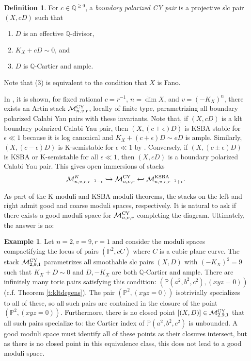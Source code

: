 \documentclass[11pt]{amsart}
\numberwithin{equation}{section}
\theoremstyle{definition}
\newtheorem{defn}[theorem]{Definition}
\newtheorem{example}[theorem]{Example}
\newcommand{\bQ}{\mathbb{Q}}
\newcommand{\KSBA}{{\rm KSBA}}
\newcommand{\bP}{\mathbb{P}}
\newcommand{\cM}{\mathcal M}
\begin{document}
\begin{defn}\label{d:bpcy}
For $c \in \bQ^{\ge 0}$, a \emph{boundary polarized CY pair} is a projective slc pair $(X,cD)$ such that 
\begin{enumerate}
	\item $D$ is an effective $\bQ$-divisor,
	\item $K_{X}+cD\sim 0$, and
	\item $D$ is $\mathbb{Q}$-Cartier and ample.
\end{enumerate}
Note that (3) is equivalent to the condition that $X$ is Fano. 
\end{defn}

In \cite{BABWILD}, it is shown, for fixed rational $c = r^{-1}$, $n = \dim X$, and $v = (-K_X)^n$, there exists an Artin stack $\cM^{\rm CY}_{n,v,r}$, locally of finite type, parametrizing all boundary polarized Calabi Yau pairs with these invariants.  Note that, if $(X,cD)$ is a klt boundary polarized Calabi Yau pair, then $(X,(c+\epsilon)D)$ is KSBA stable for $\epsilon \ll 1$ because it is log canonical and $K_X + (c+\epsilon )D \sim e D$ is ample.  Similarly, $(X,(c-\epsilon)D)$ is K-semistable for $\epsilon \ll 1$ by \cite[Lemma 5.3]{Zhou}.  Conversely, if $(X, (c\pm\epsilon)D)$ is KSBA or K-semistable for all $\epsilon \ll 1$, then $(X,cD)$ is a boundary polarized Calabi Yau pair.  This gives open immersions of stacks 
\[ \cM^K_{n,v,r,r^{-1}-\epsilon} \hookrightarrow \cM^{\rm CY}_{n,v,r} \hookleftarrow \cM^\KSBA_{n,v,r,r^{-1}+\epsilon}.\]

As part of the K-moduli and KSBA moduli theorems, the stacks on the left and right admit good and coarse moduli spaces, respectively.  It is natural to ask if there exists a good moduli space for $\cM^{\rm CY}_{n,v,r}$ completing the diagram.  Ultimately, the answer is no: 

\begin{example}
    Let $n = 2, v = 9, r = 1$ and consider the moduli spaces compactifying the locus of pairs $(\bP^2, cC)$ where $C$ is a cubic plane curve.  The stack $\cM^{\rm CY}_{2,9,1}$ parametrizes all smoothable slc pairs $(X,D)$ with $(-K_X)^2 = 9$ such that $K_X + D \sim 0$ and $D, -K_X$ are both $\bQ$-Cartier and ample.  There are infinitely many toric pairs satisfying this condition: $(\bP(a^2, b^2,c^2), (xyz = 0))$ (c.f. Theorem \ref{t:kltdegens}).  The pair $(\bP^2, (xyz=0))$ isotrivially specializes to all of these, so all such pairs are contained in the closure of the point $(\bP^2, (xyz = 0))$.  Furthermore, there is no closed point $[(X,D)] \in \cM^{\rm CY}_{2,9,1}$ that all such pairs specialize to: the Cartier index of $\bP(a^2,b^2,c^2)$ is unbounded.  A good moduli space must identify all of these points as their closures intersect, but as there is no closed point in this equivalence class, this does not lead to a good moduli space.
\end{example}
\end{document}
